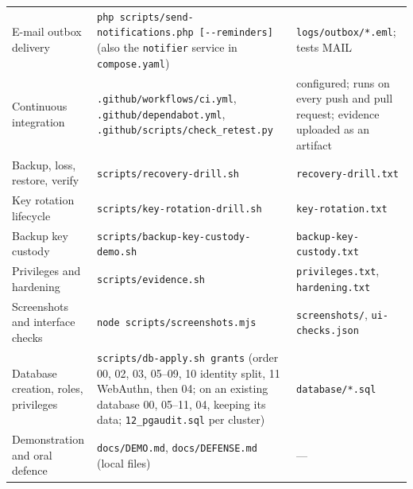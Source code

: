 \documentclass[10pt,a4paper]{article}
\newcommand{\code}[1]{\nolinkurl{#1}}
\begin{document}
\begin{center}
\begin{longtable}{@{}L{3.95cm}L{5.08cm}L{5.83cm}@{}}
E-mail outbox delivery & \code{php scripts/send-notifications.php [--reminders]} (also the \code{notifier} service in \code{compose.yaml}) & \code{logs/outbox/*.eml}; tests MAIL\\
Continuous integration & \code{.github/workflows/ci.yml}, \code{.github/dependabot.yml}, \code{.github/scripts/check\_retest.py} & configured; runs on every push and pull request; evidence uploaded as an artifact\\
Backup, loss, restore, verify & \code{scripts/recovery-drill.sh} & \code{recovery-drill.txt}\\
Key rotation lifecycle & \code{scripts/key-rotation-drill.sh} & \code{key-rotation.txt}\\
Backup key custody & \code{scripts/backup-key-custody-demo.sh} & \code{backup-key-custody.txt}\\
Privileges and hardening & \code{scripts/evidence.sh} & \code{privileges.txt}, \code{hardening.txt}\\
Screenshots and interface checks & \code{node scripts/screenshots.mjs} & \code{screenshots/}, \code{ui-checks.json}\\
Database creation, roles, privileges & \code{scripts/db-apply.sh grants} (order 00, 02, 03, 05--09, 10 identity split, 11 WebAuthn, then 04; on an existing database 00, 05--11, 04, keeping its data; \code{12\_pgaudit.sql} per cluster) & \code{database/*.sql}\\
Demonstration and oral defence & \code{docs/DEMO.md}, \code{docs/DEFENSE.md} (local files) & ---\\
\bottomrule\end{longtable}\end{center}
\end{document}
